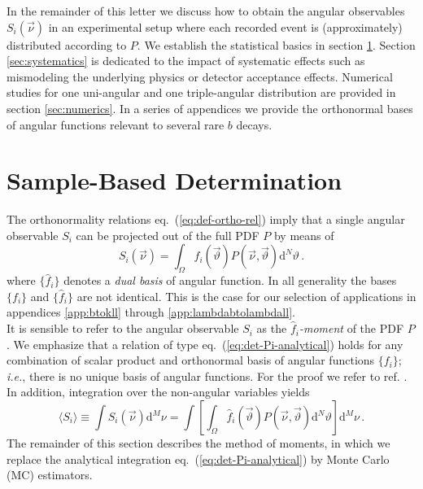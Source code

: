 \documentclass[aps,prd,reprint,nofootinbib,preprintnumbers]{revtex4}
\newcommand{\dd}{\text{d}}
\newcommand{\refeq}[1]{eq.~(\ref{eq:#1})}
\newcommand{\ie}{\textit{i.e.}}
\newcommand{\nuvec}{\vec{\nu}}
\newcommand{\thvec}{\vec{\vartheta}}
\renewcommand{\theta}{\vartheta}
\begin{document}
In the remainder of this letter we discuss how to obtain the angular
observables $S_i(\nuvec)$ in an experimental setup where each recorded
event is (approximately) distributed according to $P$.  We establish
the statistical basics in section \ref{sec:sample-based-det}. Section
\ref{sec:systematics} is dedicated to the impact of systematic effects
such as mismodeling the underlying physics or detector acceptance
effects. Numerical studies for one uni-angular and one triple-angular
distribution are provided in section \ref{sec:numerics}. In a series
of appendices we provide the orthonormal bases of angular functions
relevant to several rare $b$ decays.



\section{Sample-Based Determination}
\label{sec:sample-based-det}

The orthonormality relations \refeq{def-ortho-rel} imply that a single angular observable $S_i$
can be projected out of the full PDF $P$ by means of
\begin{equation}
    \label{eq:det-Pi-analytical}
    S_i(\nuvec) = \int_{\Omega} \hat{f}_i(\thvec) P(\nuvec, \thvec) \dd^N \theta\,.
\end{equation}
where $\lbrace \hat{f}_i \rbrace$ denotes a \emph{dual basis} of angular function. In all generality
the bases $\lbrace f_i \rbrace$ and $\lbrace \hat{f}_i \rbrace$ are not identical. This is the
case for our selection of applications in appendices \ref{app:btokll} through \ref{app:lambdabtolambdall}.\\

It is sensible to refer to the angular observable $S_i$ as the \emph{$\hat{f}_i$-moment} of the PDF $P$.
We emphasize that a relation of type \refeq{det-Pi-analytical} holds for any combination of
scalar product and orthonormal basis of angular functions $\lbrace f_i \rbrace$; \ie, there is no unique
basis of angular functions. For the proof we refer to ref. \cite{Dighe:1998vk}.\\
In addition, integration over the non-angular variables yields
\begin{equation}
    \langle S_i\rangle
    \equiv \int S_i(\nuvec) \dd^M \nu
    = \int \left[\int_{\Omega} \hat{f}_i(\thvec) P(\nuvec,\thvec) \dd^N\theta\right]\dd^M \nu\,.
\end{equation}
The remainder of this section describes the method of moments, in which we replace the
analytical integration \refeq{det-Pi-analytical} by Monte Carlo (MC) estimators.\\
\end{document}
